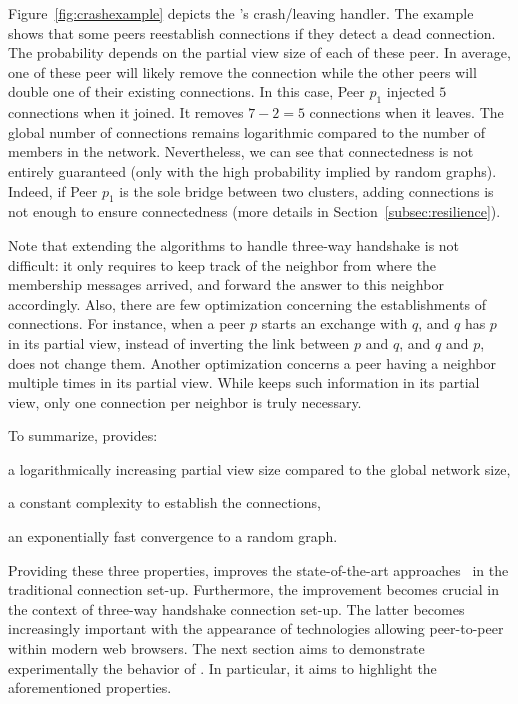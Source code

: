 Figure~\ref{fig:crashexample} depicts the \SCAMPLON{}'s crash/leaving
handler. The example shows that some peers reestablish connections if they
detect a dead connection. The probability depends on the partial view size of
each of these peer. In average, one of these peer will likely remove the
connection while the other peers will double one of their existing
connections. In this case, Peer $p_1$ injected $5$ connections when it
joined. It removes $7-2 =5 $ connections when it leaves. The global number of
connections remains logarithmic compared to the number of members in the
network. Nevertheless, we can see that connectedness is not entirely guaranteed
(only with the high probability implied by random graphs). Indeed, if Peer
$p_1$ is the sole bridge between two clusters, adding connections is not enough
to ensure connectedness (more details in Section~\ref{subsec:resilience}).

Note that extending the algorithms to handle three-way handshake is not
difficult: it only requires to keep track of the neighbor from where the
membership messages arrived, and forward the answer to this neighbor
accordingly. Also, there are few optimization concerning the establishments of
connections. For instance, when a peer $p$ starts an exchange with $q$, and $q$
has $p$ in its partial view, instead of inverting the link between $p$ and $q$,
and $q$ and $p$, \SCAMPLON{} does not change them. Another optimization
concerns a peer having a neighbor multiple times in its partial view. While
\SCAMPLON{} keeps such information in its partial view, only one connection per
neighbor is truly necessary.

To summarize, \SCAMPLON{} provides:
\begin{inparaenum}[(i)]
\item a logarithmically increasing partial view size compared to the global
  network size,
\item a constant complexity to establish the connections,
\item an exponentially fast convergence to a random graph.
\end{inparaenum}
Providing these three properties, \SCAMPLON{} improves the state-of-the-art
approaches~\cite{ganesh2001scamp,voulgaris2005cyclon} in the traditional
connection set-up. Furthermore, the improvement becomes crucial in the context
of three-way handshake connection set-up.  The latter becomes increasingly
important with the appearance of technologies allowing peer-to-peer within
modern web browsers.  The next section aims to demonstrate experimentally the
behavior of \SCAMPLON{}. In particular, it aims to highlight the aforementioned
properties.


